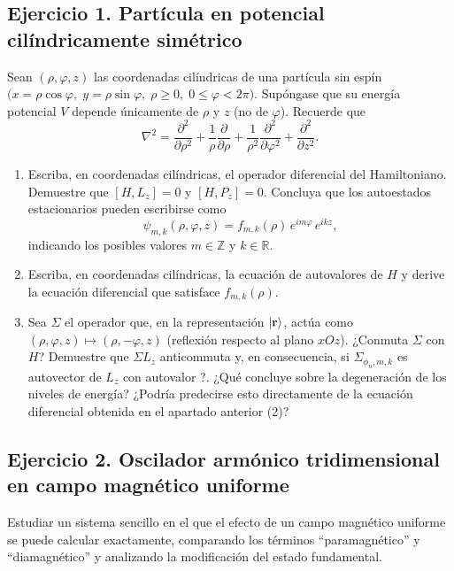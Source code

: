\documentclass[a4paper,11pt]{article}
\begin{document}
\subsection*{Ejercicio 1. Partícula en potencial cilíndricamente simétrico}
Sean \((\rho,\varphi,z)\) las coordenadas cilíndricas de una partícula sin espín
\(\bigl(x=\rho\cos\varphi,\;y=\rho\sin\varphi,\;\rho\ge0,\;0\le\varphi<2\pi\bigr)\).
Supóngase que su energía potencial \(V\) depende únicamente de \(\rho\) y \(z\) (no de \(\varphi\)).  
Recuerde que
\[
\nabla^2 = \frac{\partial^2}{\partial \rho^2}
+ \frac{1}{\rho}\frac{\partial}{\partial \rho}
+ \frac{1}{\rho^2}\frac{\partial^2}{\partial \varphi^2}
+ \frac{\partial^2}{\partial z^2}.
\]
\begin{enumerate}
  \item Escriba, en coordenadas cilíndricas, el operador diferencial del Hamiltoniano.
  Demuestre que \([H,L_z]=0\) y \([H,P_z]=0\). Concluya que los autoestados estacionarios pueden
  escribirse como
  \[
    \psi_{m,k}(\rho,\varphi,z) = f_{m,k}(\rho)\,e^{im\varphi}\,e^{ikz},
  \]
  indicando los posibles valores \(m\in\mathbb{Z}\) y \(k\in\mathbb{R}\).
  
  \item Escriba, en coordenadas cilíndricas, la ecuación de autovalores de \(H\) y derive
  la ecuación diferencial que satisface \(f_{m,k}(\rho)\).
  
  \item Sea \(\Sigma\) el operador que, en la representación \(\ket{\mathbf{r}}\), actúa como
  \((\rho,\varphi,z)\mapsto(\rho,-\varphi,z)\) (reflexión respecto al plano \(xOz\)).  
  ¿Conmuta \(\Sigma\) con \(H\)? Demuestre que \(\Sigma L_z\) anticommuta y, en consecuencia, si \(\Sigma_{\phi_n,m,k}\) es autovector de \(L_z\) con autovalor ?.  
  ¿Qué concluye sobre la degeneración de los niveles de energía? ¿Podría predecirse esto
  directamente de la ecuación diferencial obtenida en el apartado anterior (2)?
\end{enumerate}

\subsection*{Ejercicio 2. Oscilador armónico tridimensional en campo magnético uniforme}
Estudiar un sistema sencillo en el que el efecto de un campo magnético uniforme se puede calcular exactamente, comparando los términos “paramagnético” y “diamagnético” y analizando la modificación del estado fundamental.
\end{document}
